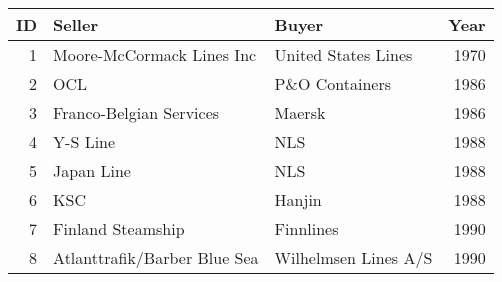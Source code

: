 
\begin{tabular}[t]{rllr}
\toprule
ID & Seller & Buyer & Year\\
\midrule
1 & Moore-McCormack Lines Inc & United States Lines & 1970\\
2 & OCL & P\&O Containers & 1986\\
3 & Franco-Belgian Services & Maersk & 1986\\
4 & Y-S Line & NLS & 1988\\
5 & Japan Line & NLS & 1988\\
6 & KSC & Hanjin & 1988\\
7 & Finland Steamship & Finnlines & 1990\\
8 & Atlanttrafik/Barber Blue Sea & Wilhelmsen Lines A/S & 1990\\
\bottomrule
\end{tabular}

